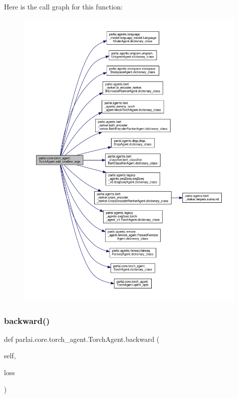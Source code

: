 Here is the call graph for this function\+:
\nopagebreak
\begin{figure}[H]
\begin{center}
\leavevmode
\includegraphics[width=350pt]{classparlai_1_1core_1_1torch__agent_1_1TorchAgent_a4a72bdd07d2cb5ce402d0058140cad0d_cgraph}
\end{center}
\end{figure}
\mbox{\label{classparlai_1_1core_1_1torch__agent_1_1TorchAgent_a8df662b1258ec67752b4fc0ad45733f9}} 
\subsubsection{\texorpdfstring{backward()}{backward()}}
{\footnotesize\ttfamily def parlai.\+core.\+torch\+\_\+agent.\+Torch\+Agent.\+backward (\begin{DoxyParamCaption}\item[{}]{self,  }\item[{}]{loss }\end{DoxyParamCaption})}

